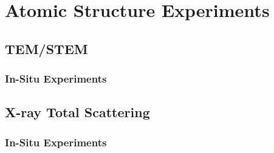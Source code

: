 \section{Atomic Structure Experiments}
\subsection{TEM/STEM}
\subsubsection{In-Situ Experiments}

\subsection{X-ray Total Scattering}
\subsubsection{In-Situ Experiments}

